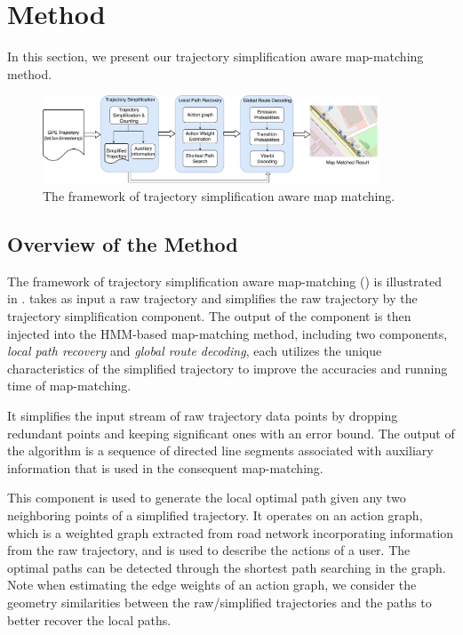 
\section{Method}
\label{sec-method}

In this section, we present our {trajectory simplification} aware map-matching method.


\begin{figure}[htb!]
	\centering
  \includegraphics[width=0.89\textwidth, height  = 0.22\textwidth]{Figures/Fig-Architecture-en.pdf}\hspace{1ex}
	\vspace{-1ex}
	\caption{The framework of trajectory simplification aware map matching.}
	\label{fig:sys-arc}
	\vspace{-1ex}
\end{figure}


\subsection{Overview of the Method}
The framework of {trajectory simplification} aware map-matching (\stmm) is illustrated in .
\stmm takes as input a raw trajectory and simplifies the raw trajectory by the trajectory simplification component. The output of the component is then injected into the HMM-based map-matching method, including two components, \emph{local path recovery} and \emph{global route decoding}, each utilizes the unique characteristics of the simplified trajectory to improve the accuracies and running time of map-matching.

It simplifies the input stream of raw trajectory data points by dropping redundant points and keeping significant ones with an error bound. The output of the algorithm is a sequence of directed line segments associated with auxiliary information that is used in the consequent map-matching.

This component is used to generate the local optimal path given any two neighboring points of a simplified trajectory.
It operates on an action graph, which is a weighted graph extracted from road network incorporating information from the raw trajectory, and is used to describe the actions of a user.  The optimal paths can be detected through the shortest path searching in the graph. Note when estimating the edge weights of an action graph, we consider the geometry similarities between the raw/simplified trajectories and the paths to better recover the local paths.

